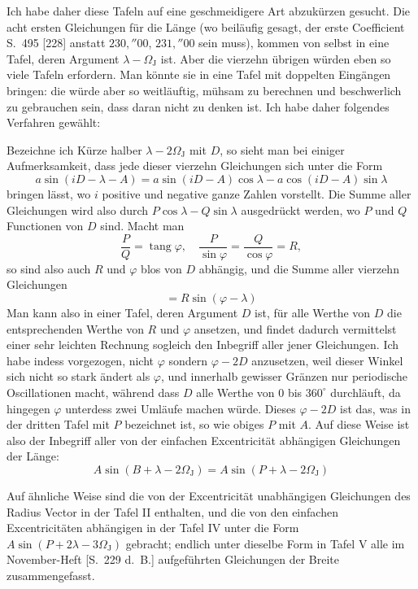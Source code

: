 \documentclass[11pt,a4paper]{book}
\newcommand{\tang}{\operatorname{tang}}
\begin{document}
Ich habe daher diese Tafeln auf eine geschmeidigere Art abzukürzen gesucht. Die acht ersten Gleichungen für die Länge (wo beiläufig gesagt, der erste Coefficient S.~495 [228] anstatt $230{,}''00$, $231{,}''00$ sein muss), kommen von selbst in eine Tafel, deren Argument $\lambda - \Omega_{\mathrm{J}}$ ist. Aber die vierzehn übrigen würden eben so viele Tafeln erfordern. Man könnte sie in eine Tafel mit doppelten Eingängen bringen: die würde aber so weitläuftig, mühsam zu berechnen und beschwerlich zu gebrauchen sein, dass daran nicht zu denken ist. Ich habe daher folgendes Verfahren gewählt:

Bezeichne ich Kürze halber $\lambda - 2\Omega_{\mathrm{J}}$ mit $D$, so sieht man bei einiger Aufmerksamkeit, dass jede dieser vierzehn Gleichungen sich unter die Form
\[
a \sin(iD - \lambda - A) = a \sin(iD - A) \cos \lambda - a \cos(iD - A) \sin \lambda
\]
bringen lässt, wo $i$ positive und negative ganze Zahlen vorstellt. Die Summe aller Gleichungen wird also durch $P \cos \lambda - Q \sin \lambda$ ausgedrückt werden, wo $P$ und $Q$ Functionen von $D$ sind. Macht man
\[
\frac{P}{Q} = \tang \varphi, \quad \frac{P}{\sin \varphi} = \frac{Q}{\cos \varphi} = R,
\]
so sind also auch $R$ und $\varphi$ blos von $D$ abhängig, und die Summe aller vierzehn Gleichungen
\[
= R \sin(\varphi - \lambda)
\]
Man kann also in einer Tafel, deren Argument $D$ ist, für alle Werthe von $D$ die entsprechenden Werthe von $R$ und $\varphi$ ansetzen, und findet dadurch vermittelst einer sehr leichten Rechnung sogleich den Inbegriff aller jener Gleichungen. Ich habe indess vorgezogen, nicht $\varphi$ sondern $\varphi - 2D$ anzusetzen, weil dieser Winkel sich nicht so stark ändert als $\varphi$, und innerhalb gewisser Gränzen nur periodische Oscillationen macht, während dass $D$ alle Werthe von $0$ bis $360^{\circ}$ durchläuft, da hingegen $\varphi$ unterdess zwei Umläufe machen würde. Dieses $\varphi - 2D$ ist das, was in der dritten Tafel mit $P$ bezeichnet ist, so wie obiges $P$ mit $A$. Auf diese Weise ist also der Inbegriff aller von der einfachen Excentricität abhängigen Gleichungen der Länge:
\[
A \sin(B + \lambda - 2\Omega_{\mathrm{J}}) = A \sin(P + \lambda - 2\Omega_{\mathrm{J}})
\]

Auf ähnliche Weise sind die von der Excentricität unabhängigen Gleichungen des Radius Vector in der Tafel II enthalten, und die von den einfachen Excentricitäten abhängigen in der Tafel IV unter die Form $A \sin(P + 2\lambda - 3\Omega_{\mathrm{J}})$ gebracht; endlich unter dieselbe Form in Tafel V alle im November-Heft [S.~229 d.~B.] aufgeführten Gleichungen der Breite zusammengefasst.
\end{document}
